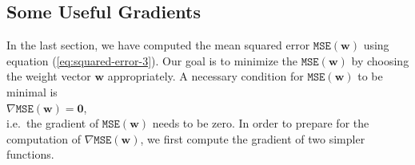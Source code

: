 \subsection{Some Useful Gradients}
In the last section, we have computed the mean squared error $\mathtt{MSE}(\mathbf{w})$ using equation
(\ref{eq:squared-error-3}).  Our goal is to minimize the $\mathtt{MSE}(\mathbf{w})$ by choosing the weight
vector $\mathbf{w}$ appropriately.  A necessary condition for $\mathtt{MSE}(\mathbf{w})$ to be minimal is 
\\[0.2cm]
\hspace*{1.3cm}
$\nabla \mathtt{MSE}(\mathbf{w}) = \mathbf{0}$,
\\[0.2cm]
i.e.~the gradient of $\mathtt{MSE}(\mathbf{w})$ needs to be zero.  In order to prepare for the computation of
$\nabla \mathtt{MSE}(\mathbf{w})$, we first compute the gradient of two simpler functions.

